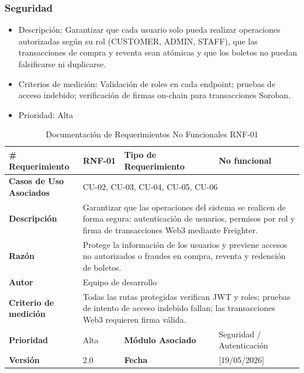 \documentclass[12pt,letterpaper]{article}
\begin{document}
\subsubsection{Seguridad}
\begin{itemize}
    \item Descripción: Garantizar que cada usuario solo pueda realizar operaciones autorizadas según su rol (CUSTOMER, ADMIN, STAFF), que las transacciones de compra y reventa sean atómicas y que los boletos no puedan falsificarse ni duplicarse.
    \item Criterios de medición: Validación de roles en cada endpoint; pruebas de acceso indebido; verificación de firmas on-chain para transacciones Soroban.
    \item Prioridad: Alta
\end{itemize}
\begin{table}[H]
\centering
\scriptsize
\renewcommand{\arraystretch}{1.2}
\setlength{\tabcolsep}{4pt}

\begin{tabularx}{\textwidth}{|p{3cm}|X|p{3cm}|X|}
\hline
\textbf{\# Requerimiento} & RNF-01 & \textbf{Tipo de Requerimiento} & No funcional \\ \hline

\textbf{Casos de Uso Asociados} & \multicolumn{3}{X|}{CU-02, CU-03, CU-04, CU-05, CU-06} \\ \hline

\textbf{Descripción} & 
\multicolumn{3}{p{\dimexpr\textwidth-6cm-12\tabcolsep-4\arrayrulewidth\relax}|}{Garantizar que las operaciones del sistema se realicen de forma segura: autenticación de usuarios, permisos por rol y firma de transacciones Web3 mediante Freighter.} \\ \hline

\textbf{Razón} & 
\multicolumn{3}{p{\dimexpr\textwidth-6cm-12\tabcolsep-4\arrayrulewidth\relax}|}{Protege la información de los usuarios y previene accesos no autorizados o fraudes en compra, reventa y redención de boletos.} \\ \hline

\textbf{Autor} & \multicolumn{3}{X|}{Equipo de desarrollo} \\ \hline

\textbf{Criterio de medición} & 
\multicolumn{3}{p{\dimexpr\textwidth-6cm-12\tabcolsep-4\arrayrulewidth\relax}|}{Todas las rutas protegidas verifican JWT y roles; pruebas de intento de acceso indebido fallan; las transacciones Web3 requieren firma válida.} \\ \hline

\textbf{Prioridad} & Alta & \textbf{Módulo Asociado} & Seguridad / Autenticación \\ \hline

\textbf{Versión} & 2.0 & \textbf{Fecha} & [19/05/2026] \\ \hline

\end{tabularx}

\caption{Documentación de Requerimientos No Funcionales RNF-01}
\label{tab:documentacion_rnf01}
\normalsize
\end{table}
\end{document}
